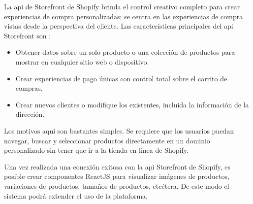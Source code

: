 La \acrshort{api} de Storefront de Shopify brinda el control creativo completo para crear experiencias de compra personalizadas; se centra en las experiencias de compra vistas desde la perspectiva del cliente. Las características principales del \acrshort{api} Storefront son \cite{storefront}:
\begin{itemize}
  \item Obtener datos sobre un solo producto o una colección de productos para mostrar en cualquier sitio web o dispositivo.
  \item Crear experiencias de pago únicas con control total sobre el carrito de compras.
  \item Crear nuevos clientes o modifique los existentes, incluida la información de la dirección.
\end{itemize}
Los motivos aquí son bastantes simples. Se requiere que los usuarios puedan navegar, buscar y seleccionar productos directamente en un dominio personalizado sin tener que ir a la tienda en linea de Shopify.
\vspace{0.8cm}

Una vez realizada una conexión exitosa con la \acrshort{api} Storefront de Shopify, es posible crear componentes ReactJS para visualizar imágenes de productos, variaciones de productos, tamaños de productos, etcétera. De este modo el sistema podrá extender el uso de la plataforma.

\newpage

